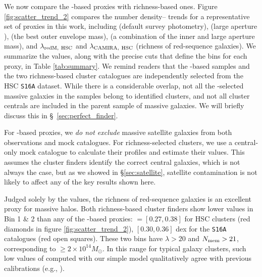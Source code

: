 \documentclass[fleqn,usenatbib,useAMS]{mnras}
\begin{document}
    We now compare the \mstar{}-based proxies with richness-based ones. 
    Figure \ref{fig:scatter_trend_2} compares the number density--\sigmvir{} trends for a 
    representative set of \mvir{} proxies in this work, including \mcmodel{} (default survey
    photometry),  (large aperture \mstar{}),  (the best outer envelope
    mass), \masap{} (a combination of the inner and large aperture mass), and $\lambda_{\rm redM,\
    HSC}$ and $\lambda_{\rm CAMIRA,\ HSC}$ (richness of red-sequence galaxies).
    We summarize the \sigmvir{} values, along with the precise cuts that define the bins for each
    \mvir{} proxy, in Table \ref{tab:summary}. 
    We remind readers that the \mstar{}-based samples and the two richness-based
    cluster catalogues are independently selected from the HSC \texttt{S16A} dataset.
    While there is a considerable overlap, not all the \mstar{}-selected massive galaxies in the
    \topn{} samples belong to identified clusters, and not all cluster centrals are included in the
    parent sample of massive galaxies.
    We will briefly discuss this in \S\ \ref{sec:perfect_finder}.

    For \mstar{}-based proxies, we \emph{do not exclude} massive satellite galaxies from both
    observations and mock catalogues.
    For richness-selected clusters, we use a central-only mock catalogue to calculate their \dsigma{}
    profiles and estimate their \sigmvir{} values. 
    This assumes the cluster finders identify the correct central galaxies, which is not always the
    case, but as we showed in \S\ref{sec:satellite}, satellite contamination is not likely to affect
    any of the key results shown here.
    
    Judged solely by the \sigmvir{} values, the richness of red-sequence galaxies is an excellent
    \mvir{} proxy for massive halos.
    Both richness-based cluster finders show lower \sigmvir{} values in Bin 1 \& 2 than any of the
    \mstar{}-based \mvir{} proxies:
    \sigmvir{}$=[0.27, 0.38]$ for HSC \redm{} clusters (red diamonds in figure
    \ref{fig:scatter_trend_2}), $[0.30, 0.36]$ dex for the \camira{} \texttt{S16A} catalogues (red
    open squares).
    These two bins have \redm{} $\lambda > 20$ and \camira{} $N_{\rm mem} > 21$,
    corresponding to \mvir{}$\geq 2\times 10^{14} M_{\odot}$.
    In this \mvir{} range for typical galaxy clusters, such low values of \sigmvir{} computed with
    our simple model qualitatively agree with previous calibrations (e.g., \citealt{Murata2018,
    Murata2019}).
\end{document}
